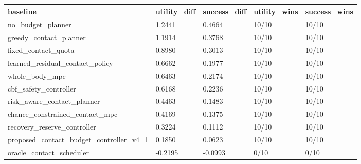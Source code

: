 \begin{tabular}{lllll}
\toprule
baseline & utility\_diff & success\_diff & utility\_wins & success\_wins \\
\midrule
no\_budget\_planner & 1.2441 & 0.4664 & 10/10 & 10/10 \\
greedy\_contact\_planner & 1.1914 & 0.3768 & 10/10 & 10/10 \\
fixed\_contact\_quota & 0.8980 & 0.3013 & 10/10 & 10/10 \\
learned\_residual\_contact\_policy & 0.6662 & 0.1977 & 10/10 & 10/10 \\
whole\_body\_mpc & 0.6463 & 0.2174 & 10/10 & 10/10 \\
cbf\_safety\_controller & 0.6168 & 0.2236 & 10/10 & 10/10 \\
risk\_aware\_contact\_planner & 0.4463 & 0.1483 & 10/10 & 10/10 \\
chance\_constrained\_contact\_mpc & 0.4169 & 0.1375 & 10/10 & 10/10 \\
recovery\_reserve\_controller & 0.3224 & 0.1112 & 10/10 & 10/10 \\
proposed\_contact\_budget\_controller\_v4\_1 & 0.1850 & 0.0623 & 10/10 & 10/10 \\
oracle\_contact\_scheduler & -0.2195 & -0.0993 & 0/10 & 0/10 \\
\bottomrule
\end{tabular}
